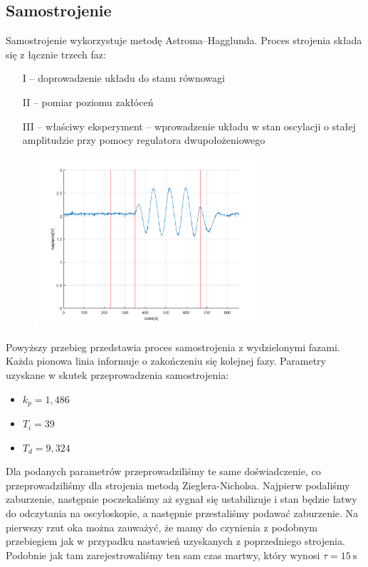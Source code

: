 \documentclass[a4paper, 12pt]{article}
\begin{document}
		\subsection{Samostrojenie}
			Samostrojenie wykorzystuje metodę Astroma--Hagglunda. Proces strojenia składa się z łącznie trzech faz:
			\begin{itemize}
				\item[I] -- doprowadzenie układu do stanu równowagi
				\item[II] -- pomiar poziomu zakłóceń
				\item[III] -- właściwy eksperyment -- wprowadzenie układu w stan oscylacji o stałej amplitudzie przy pomocy regulatora dwupołożeniowego
			\end{itemize}
			\begin{figure}[H]
				\centering
				\includegraphics[width=0.75\textwidth]{./img/strojenie.png}
			\end{figure}
			Powyższy przebieg przedstawia proces samostrojenia z wydzielonymi fazami. Każda pionowa linia informuje o zakończeniu się kolejnej fazy. Parametry uzyskane w skutek przeprowadzenia samostrojenia:
			\begin{itemize}
				\item $k_{p} = 1,486$ 
				\item $T_i = 39$
				\item $T_d = 9,324$
			\end{itemize}
			Dla podanych parametrów przeprowadziliśmy te same doświadczenie, co przeprowadziliśmy dla strojenia metodą Zieglera-Nicholsa. Najpierw podaliśmy zaburzenie, następnie poczekaliśmy aż sygnał się ustabilizuje i stan będzie łatwy do odczytania na oscyloskopie, a następnie przestaliśmy podawać zaburzenie. \newpage
			Na pierwszy rzut oka można zauważyć, że mamy do czynienia z podobnym przebiegiem jak w przypadku nastawień uzyskanych z poprzedniego strojenia. Podobnie jak tam zarejestrowaliśmy ten sam czas martwy, który wynosi $\tau = 15\ \mathrm{s}$
\end{document}
